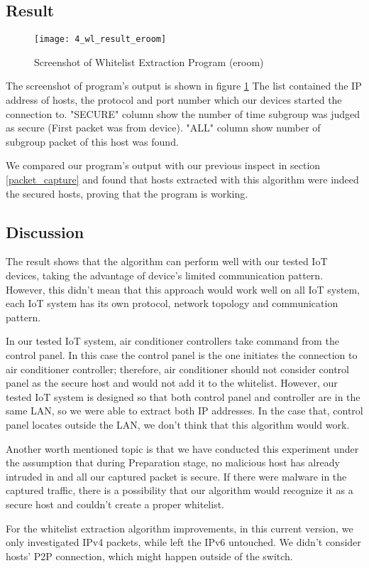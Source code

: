 \subsection{Result}

\begin{figure}[h]
    \centering 
    \texttt{[image: 4\_wl\_result\_eroom]}
    \caption{Screenshot of Whitelist Extraction Program (eroom)}
    \label{fig:s4_wl_result_eroom}
\end{figure}

The screenshot of program's output is shown in figure \ref{fig:s4_wl_result_eroom}
The list contained the IP address of hosts, the protocol and port number which our devices started the connection to.
"SECURE" column show the number of time subgroup was judged as secure (First packet was from device).
"ALL" column show number of subgroup packet of this host was found. 

We compared our program's output with our previous inspect in section \ref{packet_capture} and found that
hosts extracted with this algorithm were indeed the secured hosts, proving that the program is working.

\subsection{Discussion} 

The result shows that the algorithm can perform well with our tested IoT devices, taking the advantage of device's limited communication pattern. However, this didn’t mean that this approach would work well on all IoT system, each IoT system has its own protocol, network topology and communication pattern.  

In our tested IoT system, air conditioner controllers take command from the control panel. In this case the control panel is the one initiates the connection to air conditioner controller; therefore, air conditioner should not consider control panel as the secure host and would not add it to the whitelist. However, our tested IoT system is designed so that both control panel and controller are in the same LAN, so we were able to extract both IP addresses. In the case that, control panel locates outside the LAN, we don’t think that this algorithm would work. 

Another worth mentioned topic is that we have conducted this experiment under the assumption that during Preparation stage, no malicious host has already intruded in and all our captured packet is secure. If there were malware in the captured traffic, there is a possibility that our algorithm would recognize it as a secure host and couldn’t create a proper whitelist.   

For the whitelist extraction algorithm improvements, in this current version, we only investigated IPv4 packets, while left the IPv6 untouched. We didn’t consider hosts’ P2P connection, which might happen outside of the switch. 